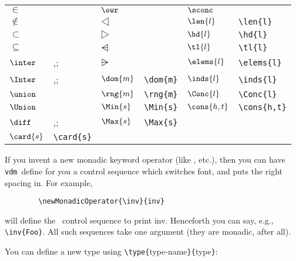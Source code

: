 \documentclass{article}
\newcommand{\Vdm}{{\tt vdm\/}}
\newenvironment{dangerous}{\par\vspace{5pt}\bgroup\small\noindent}%
                          {\par\egroup\vspace{5pt}}
\renewcommand{\^}[1]{$\langle${\rm #1\/}$\rangle$}
\newcommand{\cs}[1]{\leavevmode\hbox{\tt \string#1}}
\begin{document}
\begin{center}\small
\begin{tabular}{llllll}
$\in$           & \cs\in        &
        $\owr$  & \cs\owr       &
                $\sconc$        & \cs\sconc     \\
$\notin$        & \cs\notin     &
        $\dres$ & \cs\dres      &
                $\len{l}$       & \verb;\len{l};\\
$\subset$       & \cs\subset&
        $\rres$ & \cs\rres      &
                $\hd{l}$        & \verb;\hd{l}; \\
$\subseteq$     & \cs\subseteq&
        $\dsub$ & \cs\dsub      &
                $\tl{l}$        & \verb;\tl{l}; \\
$\inter$        & \cs\inter,\cs\intersection;&
        $\rsub$ & \cs\rsub      &
                $\elems{l}$     & \verb;\elems{l};\\
$\Inter$        & \cs\Inter,\cs\Intersection;&
        $\dom{m}$&\verb;\dom{m};&
                $\inds{l}$      & \verb;\inds{l};\\
$\union$        & \cs\union     &
        $\rng{m}$&\verb;\rng{m};&
                $\Conc{l}$      & \verb;\Conc{l};\\
$\Union$        & \cs\Union     &
        $\Min{s}$& \verb;\Min{s};&
                $\cons{h,t}$    & \verb;\cons{h,t};\\
$\diff$         & \cs\diff,\cs\difference;&
        $\Max{s}$& \verb;\Max{s};&
                                &       \\
$\card{s}$      & \verb;\card{s};&
                &               &
                                &
\end{tabular}
\end{center}

\begin{dangerous}
If you invent a new monadic keyword operator (like \dom{}, etc.),
then you can have \Vdm\ define for you a control sequence which
switches font, and puts the right spacing in.  For example,
\begin{verbatim}
        \newMonadicOperator{\inv}{inv}
\end{verbatim}
will define the \cs\inv\ control sequence to print
{\keywordFontBeginSequence inv\/}.  Henceforth you can say, e.g.,
\verb;\inv{Foo};.  All such sequences take one argument (they are
monadic, after all).
\end{dangerous}

You can define a new type using
\verb;\type{;type-name\verb;}{;type\verb;};:
\end{document}
